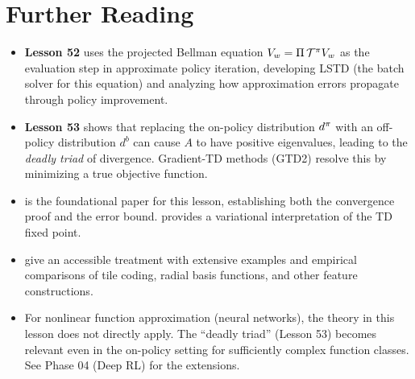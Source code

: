 \documentclass[11pt,a4paper]{article}
\begin{document}
\section{Further Reading}
\label{sec:further_reading}

\begin{itemize}
  \item \textbf{Lesson 52} uses the projected Bellman equation
    $V_w = \Pi\,\mathcal{T}^\pi V_w$ as the evaluation step in
    approximate policy iteration, developing LSTD (the batch solver
    for this equation) and analyzing how approximation errors
    propagate through policy improvement.

  \item \textbf{Lesson 53} shows that replacing the on-policy
    distribution $d^\pi$ with an off-policy distribution $d^b$
    can cause $A$ to have positive eigenvalues, leading to the
    \emph{deadly triad} of divergence. Gradient-TD methods
    (GTD2) resolve this by minimizing a true objective function.

  \item \citet{tsitsiklis1997} is the foundational paper for
    this lesson, establishing both the convergence proof and the
    error bound. \citet{bertsekas2009} provides a variational
    interpretation of the TD fixed point.

  \item \citet[Chapters 9--10]{suttonbarto2018} give an accessible
    treatment with extensive examples and empirical comparisons of
    tile coding, radial basis functions, and other feature
    constructions.

  \item For nonlinear function approximation (neural networks), the
    theory in this lesson does not directly apply. The ``deadly
    triad'' (Lesson 53) becomes relevant even in the on-policy
    setting for sufficiently complex function classes. See Phase 04
    (Deep RL) for the extensions.
\end{itemize}


\end{document}
